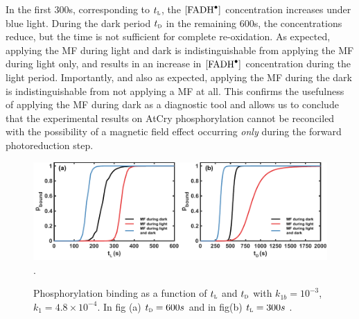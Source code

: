 \documentclass[twoside,twocolumn,9pt]{article}
\begin{document}
In the first 300s, corresponding to $t_{\textsc{l}}$, the $[\ce{FADH^{.}}]$ concentration increases under blue light. During the
dark period $t_{\textsc{d}}$ in the remaining 600s, the concentrations reduce, but the time is not sufficient for complete
re-oxidation. As expected, applying the MF during light and dark is indistinguishable from applying the MF during light only, and
results in an increase in $[\ce{FADH^{.}}]$ concentration during the light period. Importantly, and also as expected, applying the
MF during the dark is indistinguishable from not applying a MF at all. This confirms the usefulness of applying the MF during dark
as a diagnostic tool and allows us to conclude that the experimental results on AtCry phosphorylation \cite{Pooam2019} cannot be
reconciled with the possibility of a magnetic field effect occurring \emph{only} during the forward photoreduction step.\\
\begin{figure}[h]
	\centering
	\includegraphics{varyT1T2.pdf}.
	\caption{Phosphorylation binding as a function of $t_{\textsc{l}}$ and $t_{\textsc{d}}$ with $k_{1b} = 10^{-3}$, $k_{1} = 4.8
		\times 10^{-4}$. In fig (a) $t_{\textsc{d}} = 600s$ and in fig(b) $t_{\textsc{l}} = 300s$ .}
	\label{fig:varyT1T2}
\end{figure}
\end{document}
